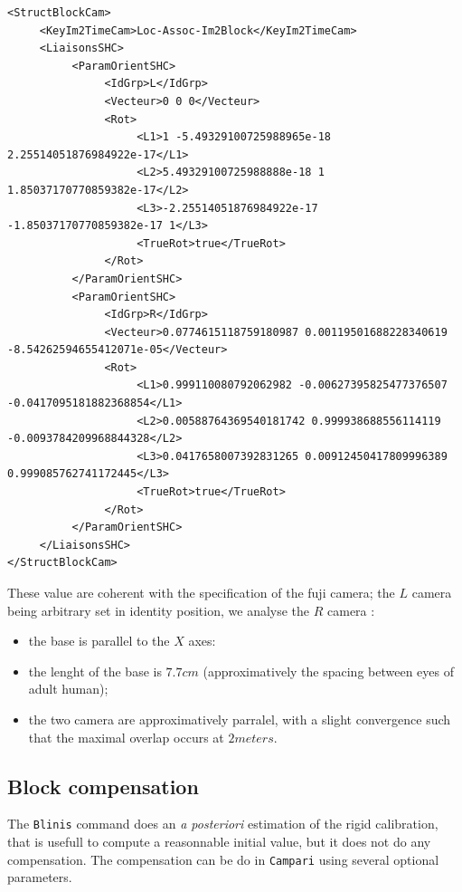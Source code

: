 \begin{verbatim}
<StructBlockCam>
     <KeyIm2TimeCam>Loc-Assoc-Im2Block</KeyIm2TimeCam>
     <LiaisonsSHC>
          <ParamOrientSHC>
               <IdGrp>L</IdGrp>
               <Vecteur>0 0 0</Vecteur>
               <Rot>
                    <L1>1 -5.49329100725988965e-18 2.25514051876984922e-17</L1>
                    <L2>5.49329100725988888e-18 1 1.85037170770859382e-17</L2>
                    <L3>-2.25514051876984922e-17 -1.85037170770859382e-17 1</L3>
                    <TrueRot>true</TrueRot>
               </Rot>
          </ParamOrientSHC>
          <ParamOrientSHC>
               <IdGrp>R</IdGrp>
               <Vecteur>0.0774615118759180987 0.00119501688228340619 -8.54262594655412071e-05</Vecteur>
               <Rot>
                    <L1>0.999110080792062982 -0.00627395825477376507 -0.0417095181882368854</L1>
                    <L2>0.00588764369540181742 0.999938688556114119 -0.0093784209968844328</L2>
                    <L3>0.0417658007392831265 0.00912450417809996389 0.999085762741172445</L3>
                    <TrueRot>true</TrueRot>
               </Rot>
          </ParamOrientSHC>
     </LiaisonsSHC>
</StructBlockCam>

\end{verbatim}

These value are coherent with the specification of the fuji camera; the $L$ camera being arbitrary
set in identity position, we  analyse the $R$ camera :

\begin{itemize}
    \item the base is parallel to the $X$ axes:
    \item the lenght of the base is $7.7 cm$ (approximatively the spacing between eyes of adult human);
    \item the two camera are approximatively parralel, with a slight convergence such that the maximal overlap
          occurs at $2 meters$.
\end{itemize}



\subsection{Block compensation}

The {\tt Blinis} command does an \emph{a posteriori} estimation of the rigid calibration,
that is usefull to compute a reasonnable initial value, but it does not do any compensation.
The compensation can be do in {\tt Campari} using several optional parameters.

